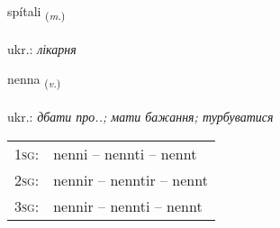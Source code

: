 \documentclass[frontgrid, backgrid]{flacards}\usepackage[]{graphicx}\usepackage[]{xcolor}
\begin{document}
\renewcommand{\flhead}{\vskip5pt \fboxsep=0pt {\small\bfseries\footnotesize Nafnorð | іменник}}
\renewcommand{\fcfoot}{\vskip5pt \fboxsep=0pt \hspace{2pt}{\small\bfseries\footnotesize 3K}}

\renewcommand{\blhead}{\vskip5pt {\small\bfseries\footnotesize Nafnorð | іменник }}
\renewcommand{\bcfoot}{\vskip5pt \hspace{2pt}{\small\bfseries\footnotesize 3K}}


{spítali \small{\textsubscript{(\textit{m.})}} \\[1ex] %
\textphonetic{[spiːtalɪ]} \\
ukr.: \emph{лікарня} \\  [2ex]
\renewcommand*{\arraystretch}{0.8}
}

\renewcommand{\flhead}{\vskip5pt \fboxsep=0pt {\small\bfseries\footnotesize Sagnorð | дієслово}}
\renewcommand{\fcfoot}{\vskip5pt \fboxsep=0pt \hspace{2pt}{\small\bfseries\footnotesize 3K}}

\renewcommand{\blhead}{\vskip5pt {\small\bfseries\footnotesize Sagnorð | дієслово }}
\renewcommand{\bcfoot}{\vskip5pt \hspace{2pt}{\small\bfseries\footnotesize 3K}}


{nenna \small{\textsubscript{(\textit{v.})}} \\[1ex] %
\textphonetic{[nɛna]} \\
ukr.: \emph{дбати про..; мати бажання; турбуватися} \\  [2ex]
\renewcommand*{\arraystretch}{0.8}
\begin{tabular}{p{1cm}l}
\textsc{1sg}: & nenni -- nennti -- nennt \\ 
\textsc{2sg}: & nennir -- nenntir -- nennt \\ 
\textsc{3sg}: & nennir -- nennti -- nennt \\ 
\end{tabular}
}
\end{document}
